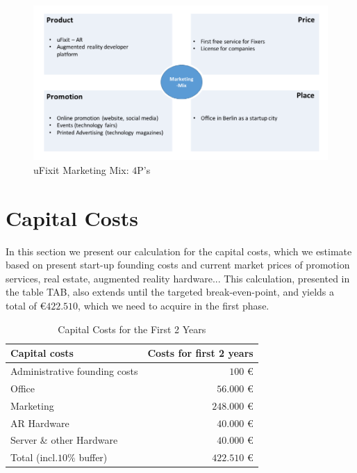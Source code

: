 \begin{figure}[H]
		\includegraphics[width=\textwidth]{../images/MarketingStrategy.png}
		\centering
		\caption[uFixit Marketing Mix: $4$P's]{uFixit Marketing Mix: $4$P's}
		\label{fig:Marketing}
\end{figure}


\section{Capital Costs}
In this section we present our calculation for the capital costs, which we estimate based on present start-up founding costs and current market prices of promotion services, real estate, augmented reality hardware... This calculation, presented in the table TAB, also extends until the targeted break-even-point, and yields a total of \euro $422.510$, which we need to acquire in the first phase.

\begin{table}[H]
\caption[Capital Costs for the First 2 Years]{Capital Costs for the First 2 Years}
\label{tab:Capital Costs}
\begin{center}
\begin{tabular}{|l|r|}
\hline 
Capital costs & Costs for first 2 years \\ 
\hline 
Administrative founding costs & $100$ \euro \\ 
\hline 
Office & $56.000$ \euro \\ 
\hline 
Marketing & $248.000$ \euro \\ 
\hline 
AR Hardware & $40.000$ \euro \\ 
\hline 
Server \& other Hardware & $40.000$ \euro \\ 
\hline 
Total (incl.$10\%$ buffer) & $422.510$ \euro \\ 
\hline 
\end{tabular} 
\end{center}
\end{table}
